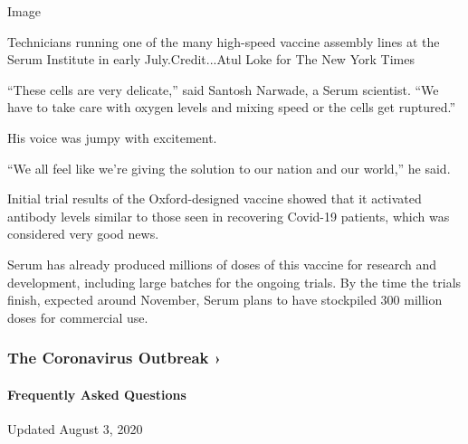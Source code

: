 Image

Technicians running one of the many high-speed vaccine assembly lines at
the Serum Institute in early July.Credit...Atul Loke for The New York
Times

``These cells are very delicate,'' said Santosh Narwade, a Serum
scientist. ``We have to take care with oxygen levels and mixing speed or
the cells get ruptured.''

His voice was jumpy with excitement.

``We all feel like we're giving the solution to our nation and our
world,'' he said.

Initial trial results of the Oxford-designed vaccine showed that it
activated antibody levels similar to those seen in recovering Covid-19
patients, which was considered very good news.

Serum has already produced millions of doses of this vaccine for
research and development, including large batches for the ongoing
trials. By the time the trials finish, expected around November, Serum
plans to have stockpiled 300 million doses for commercial use.

\href{https://www.nytimes3xbfgragh.onion/news-event/coronavirus?action=click\&pgtype=Article\&state=default\&region=MAIN_CONTENT_3\&context=storylines_faq}{}

\hypertarget{the-coronavirus-outbreak-}{%
\subsubsection{The Coronavirus Outbreak
›}\label{the-coronavirus-outbreak-}}

\hypertarget{frequently-asked-questions}{%
\paragraph{Frequently Asked
Questions}\label{frequently-asked-questions}}

Updated August 3, 2020

